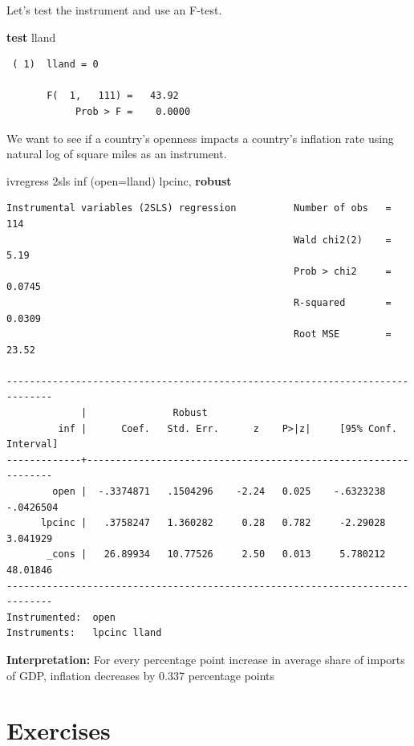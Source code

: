 \documentclass[
]{book}
\newenvironment{Shaded}{\begin{snugshade}}{\end{snugshade}}
\newcommand{\KeywordTok}[1]{\textcolor[rgb]{0.13,0.29,0.53}{\textbf{#1}}}
\newcommand{\NormalTok}[1]{#1}
\begin{document}
Let's test the instrument and use an F-test.

\begin{Shaded}
\begin{Highlighting}[]
\KeywordTok{test}\NormalTok{ lland}
\end{Highlighting}
\end{Shaded}

\begin{verbatim}
 ( 1)  lland = 0

       F(  1,   111) =   43.92
            Prob > F =    0.0000
\end{verbatim}

We want to see if a country's openness impacts a country's inflation rate using natural log of square miles as an instrument.

\begin{Shaded}
\begin{Highlighting}[]
\NormalTok{ivregress 2sls inf (open=lland) lpcinc, }\KeywordTok{robust}
\end{Highlighting}
\end{Shaded}

\begin{verbatim}
Instrumental variables (2SLS) regression          Number of obs   =        114
                                                  Wald chi2(2)    =       5.19
                                                  Prob > chi2     =     0.0745
                                                  R-squared       =     0.0309
                                                  Root MSE        =      23.52

------------------------------------------------------------------------------
             |               Robust
         inf |      Coef.   Std. Err.      z    P>|z|     [95% Conf. Interval]
-------------+----------------------------------------------------------------
        open |  -.3374871   .1504296    -2.24   0.025    -.6323238   -.0426504
      lpcinc |   .3758247   1.360282     0.28   0.782     -2.29028    3.041929
       _cons |   26.89934   10.77526     2.50   0.013     5.780212    48.01846
------------------------------------------------------------------------------
Instrumented:  open
Instruments:   lpcinc lland
\end{verbatim}

\textbf{Interpretation:} For every percentage point increase in average share of imports of GDP,
inflation decreases by 0.337 percentage points

\section{Exercises}\label{exercises}
\end{document}
